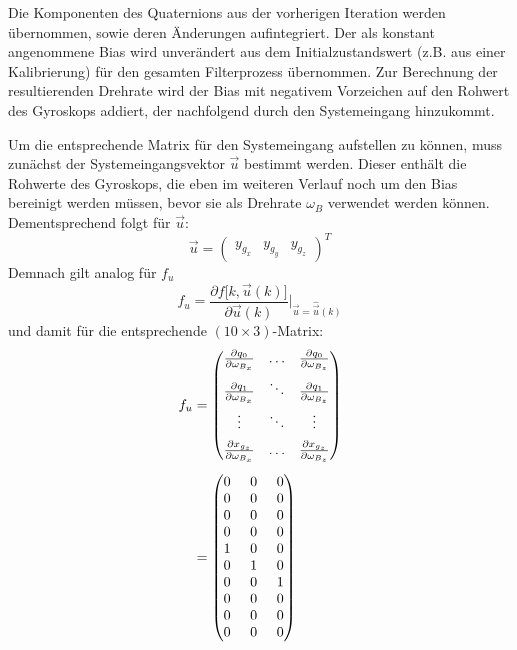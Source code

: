 \documentclass[12pt,a4paper]{article}
\newcommand{\PA}[2]{\frac{\partial #1}{\partial #2}}
\begin{document}
		Die Komponenten des Quaternions aus der vorherigen Iteration werden übernommen, sowie deren Änderungen aufintegriert. Der als konstant angenommene Bias wird unverändert aus dem Initialzustandswert (z.B. aus einer Kalibrierung) für den gesamten Filterprozess übernommen. Zur Berechnung der resultierenden Drehrate wird der Bias mit negativem Vorzeichen auf den Rohwert des Gyroskops addiert, der nachfolgend durch den Systemeingang hinzukommt.
			
		Um die entsprechende Matrix für den Systemeingang aufstellen zu können, muss zunächst der Systemeingangsvektor $\vec{u}$ bestimmt werden. Dieser enthält die Rohwerte des Gyroskops, die eben im weiteren Verlauf noch um den Bias bereinigt werden müssen, bevor sie als Drehrate $\omega_{B}$ verwendet werden können. Dementsprechend folgt für $\vec{u}$:
		\begin{equation}\label{eq:Systemeingangsvektor}
			\vec{u}=\begin{pmatrix}
			y_{g_{x}} & y_{g_{y}} & y_{g_{z}}
			\end{pmatrix}^{T}
		\end{equation}
		Demnach gilt analog für $f_{u}$
		\begin{equation}\label{eq:JacobiMatrixDefinitionSystemeingangsmatrix}
			f_{u}=\frac{\partial f\big[k,\vec{u}(k)\big]}{\partial \vec{u}(k)}\Bigg \vert_{\vec{u}=\hat{\vec{u}}(k)}
		\end{equation}
		und damit für die entsprechende $(10\times 3)$-Matrix:
		\begin{equation}
			\begin{split}
				f_{u}&=\begin{pmatrix}
				\PA{q_{0}}{\omega_{B_{x}}} & \ldots & \PA{q_{0}}{\omega_{B_{z}}}\\[0.5em]
				\PA{q_{1}}{\omega_{B_{x}}} & \ddots & \PA{q_{1}}{\omega_{B_{z}}} \\[0.5em]
				\vdots & \ddots & \vdots \\[0.5em]
				\PA{x_{g_{z}}}{\omega_{B_{x}}} & \ldots & \PA{x_{g_{z}}}{\omega_{B_{z}}} 
				\end{pmatrix}\\[0.5em]
				&=
				\setlength{\arraycolsep}{7pt}
				\begin{pmatrix}
				0 & 0 & 0 \\
				0 & 0 & 0 \\
				0 & 0 & 0 \\
				0 & 0 & 0 \\
				1 & 0 & 0 \\
				0 & 1 & 0 \\
				0 & 0 & 1 \\
				0 & 0 & 0 \\
				0 & 0 & 0 \\
				0 & 0 & 0
				\end{pmatrix}
			\end{split}
		\end{equation}
\end{document}
